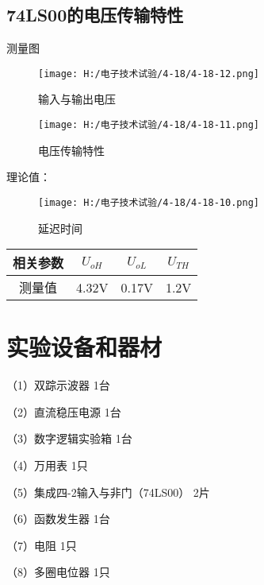 \documentclass{article}
\begin{document}
             \newpage

\subsection{74LS00的电压传输特性}
测量图
\begin{figure}[h]
    \centering
    \texttt{[image: H:/电子技术试验/4-18/4-18-12.png]}
    \caption{输入与输出电压} \label{fig:aa}
\end{figure}
\begin{figure}[h]
    \centering
    \texttt{[image: H:/电子技术试验/4-18/4-18-11.png]}
    \caption{电压传输特性} \label{fig:aa}
\end{figure}

\newpage
  理论值：
  \begin{figure}[h]
    \centering
    \texttt{[image: H:/电子技术试验/4-18/4-18-10.png]}
    \caption{延迟时间} \label{fig:aa}
\end{figure}

  \begin{table}[h]
    \centering  
    \begin{tabular}{c|c|c|c}
        \hline
         相关参数    & $U_{oH}$         & $U_{oL}$    & $U_{TH}$       \\ \hline
           测量值    & 4.32V             & 0.17V         &    1.2V                 \\ \hline
    \end{tabular}
\end{table}



	\section{ 实验设备和器材}
	（1）双踪示波器             \qquad \qquad \qquad \qquad \qquad  \qquad           1台\par
	（2）直流稳压电源             \qquad \quad \qquad \qquad \qquad \qquad           1台\par
	（3）数字逻辑实验箱            \qquad  \qquad \qquad \qquad\qquad                1台\par
	（4）万用表                   \qquad  \qquad \qquad \qquad \qquad \qquad \qquad  1只\par
	（5）集成四-2输入与非门（74LS00） \qquad    \quad                                    2片\par
    （6）函数发生器          \qquad  \qquad  \qquad \qquad \qquad\qquad                1台\par
	（7）电阻                 \quad    \qquad  \qquad \qquad \qquad \qquad \qquad \qquad  1只\par
    （8）多圈电位器                  \qquad \qquad \qquad \qquad \qquad \qquad  1只\par
\end{document}
